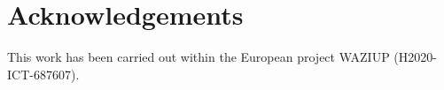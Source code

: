 
\section*{Acknowledgements}

This work has been carried out within the European project WAZIUP (H2020-ICT-687607).

